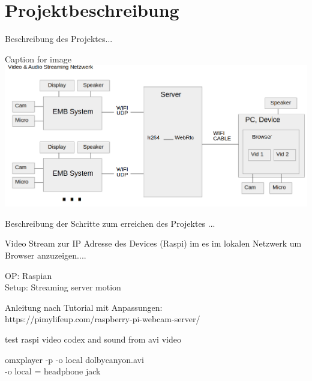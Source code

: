 \section{Projektbeschreibung}

Beschreibung des Projektes...


\begin{minipage}{\textwidth}
    \begin{center}
        Caption for image
        \includegraphics[scale=0.4]{img/schemaproj.png} 
    \end{center}
\end{minipage}


Beschreibung der Schritte zum erreichen des Projektes
...

Video Stream zur IP Adresse des Devices (Raspi) im es im lokalen 
Netzwerk um Browser anzuzeigen....

OP: Raspian\\
Setup: Streaming server motion

Anleitung nach Tutorial mit Anpassungen:\\
https://pimylifeup.com/raspberry-pi-webcam-server/

test raspi video codex and sound from avi video

omxplayer -p -o local dolbycanyon.avi\\
-o local = headphone jack